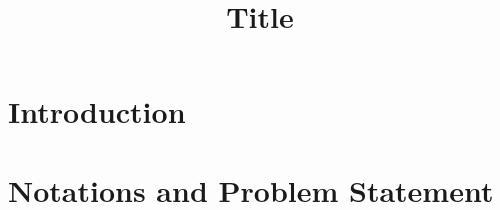 \documentclass[conference]{IEEEtran}
\begin{document}
\title{Title}

\author{
\and
{} 
}


\maketitle

\begin{abstract}
\end{abstract}

\begin{IEEEkeywords}
\end{IEEEkeywords}

\glsresetall

\section{Introduction}
\section{Notations and Problem Statement}\label{sec:notation}
\appendices
\printbibliography
\nocite{*} 
\end{document}
